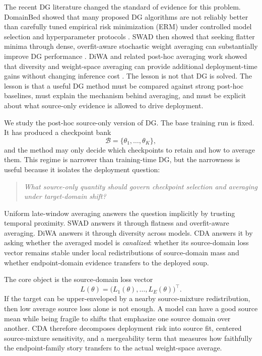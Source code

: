\documentclass{article}
\theoremstyle{definition}
\newcommand{\cB}{\mathcal{B}}
\begin{document}
The recent DG literature changed the standard of evidence for this problem. DomainBed showed that many proposed DG algorithms are not reliably better than carefully tuned empirical risk minimization (ERM) under controlled model selection and hyperparameter protocols \citep{gulrajani2021domainbed}. SWAD then showed that seeking flatter minima through dense, overfit-aware stochastic weight averaging can substantially improve DG performance \citep{cha2021swad}. DiWA and related post-hoc averaging work showed that diversity and weight-space averaging can provide additional deployment-time gains without changing inference cost \citep{rame2022diwa,arpit2022eoa,wortsman2022soups}. The lesson is not that DG is solved. The lesson is that a useful DG method must be compared against strong post-hoc baselines, must explain the mechanism behind averaging, and must be explicit about what source-only evidence is allowed to drive deployment.

We study the post-hoc source-only version of DG. The base training run is fixed. It has produced a checkpoint bank
\[
\cB=\{\theta_1,\ldots,\theta_K\},
\]
and the method may only decide which checkpoints to retain and how to average them. This regime is narrower than training-time DG, but the narrowness is useful because it isolates the deployment question:
\begin{quote}
\emph{What source-only quantity should govern checkpoint selection and averaging under target-domain shift?}
\end{quote}
Uniform late-window averaging answers the question implicitly by trusting temporal proximity. SWAD answers it through flatness and overfit-aware averaging. DiWA answers it through diversity across models. CDA answers it by asking whether the averaged model is \emph{canalized}: whether its source-domain loss vector remains stable under local redistributions of source-domain mass and whether endpoint-domain evidence transfers to the deployed soup.

The core object is the source-domain loss vector
\[
L(\theta)=\big(L_1(\theta),\ldots,L_E(\theta)\big)^\top .
\]
If the target can be upper-enveloped by a nearby source-mixture redistribution, then low average source loss alone is not enough. A model can have a good source mean while being fragile to shifts that emphasize one source domain over another. CDA therefore decomposes deployment risk into source fit, centered source-mixture sensitivity, and a mergeability term that measures how faithfully the endpoint-family story transfers to the actual weight-space average.
\end{document}
